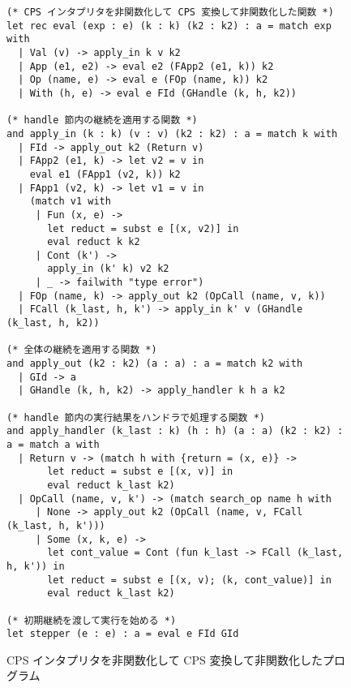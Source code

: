\begin{figure}
\begin{verbatim}
(* CPS インタプリタを非関数化して CPS 変換して非関数化した関数 *)
let rec eval (exp : e) (k : k) (k2 : k2) : a = match exp with
  | Val (v) -> apply_in k v k2
  | App (e1, e2) -> eval e2 (FApp2 (e1, k)) k2
  | Op (name, e) -> eval e (FOp (name, k)) k2
  | With (h, e) -> eval e FId (GHandle (k, h, k2))

(* handle 節内の継続を適用する関数 *)
and apply_in (k : k) (v : v) (k2 : k2) : a = match k with
  | FId -> apply_out k2 (Return v)
  | FApp2 (e1, k) -> let v2 = v in
    eval e1 (FApp1 (v2, k)) k2
  | FApp1 (v2, k) -> let v1 = v in
    (match v1 with
     | Fun (x, e) ->
       let reduct = subst e [(x, v2)] in
       eval reduct k k2
     | Cont (k') ->
       apply_in (k' k) v2 k2
     | _ -> failwith "type error")
  | FOp (name, k) -> apply_out k2 (OpCall (name, v, k))
  | FCall (k_last, h, k') -> apply_in k' v (GHandle (k_last, h, k2))

(* 全体の継続を適用する関数 *)
and apply_out (k2 : k2) (a : a) : a = match k2 with
  | GId -> a
  | GHandle (k, h, k2) -> apply_handler k h a k2

(* handle 節内の実行結果をハンドラで処理する関数 *)
and apply_handler (k_last : k) (h : h) (a : a) (k2 : k2) : a = match a with
  | Return v -> (match h with {return = (x, e)} ->
       let reduct = subst e [(x, v)] in
       eval reduct k_last k2)
  | OpCall (name, v, k') -> (match search_op name h with
     | None -> apply_out k2 (OpCall (name, v, FCall (k_last, h, k')))
     | Some (x, k, e) ->
       let cont_value = Cont (fun k_last -> FCall (k_last, h, k')) in
       let reduct = subst e [(x, v); (k, cont_value)] in
       eval reduct k_last k2)

(* 初期継続を渡して実行を始める *)
let stepper (e : e) : a = eval e FId GId
\end{verbatim}
\caption{CPS インタプリタを非関数化して CPS 変換して非関数化したプログラム}
\label{figure:4defun}
\end{figure}

